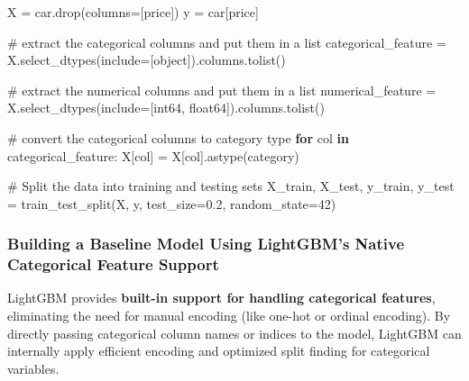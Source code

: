 \documentclass[
  letterpaper,
  DIV=11,
  numbers=noendperiod]{scrreprt}
\newenvironment{Shaded}{\begin{snugshade}}{\end{snugshade}}
\newcommand{\CommentTok}[1]{\textcolor[rgb]{0.37,0.37,0.37}{#1}}
\newcommand{\ControlFlowTok}[1]{\textcolor[rgb]{0.00,0.23,0.31}{\textbf{#1}}}
\newcommand{\DecValTok}[1]{\textcolor[rgb]{0.68,0.00,0.00}{#1}}
\newcommand{\FloatTok}[1]{\textcolor[rgb]{0.68,0.00,0.00}{#1}}
\newcommand{\KeywordTok}[1]{\textcolor[rgb]{0.00,0.23,0.31}{\textbf{#1}}}
\newcommand{\NormalTok}[1]{\textcolor[rgb]{0.00,0.23,0.31}{#1}}
\newcommand{\OperatorTok}[1]{\textcolor[rgb]{0.37,0.37,0.37}{#1}}
\newcommand{\StringTok}[1]{\textcolor[rgb]{0.13,0.47,0.30}{#1}}
\begin{document}
\begin{Shaded}
\begin{Highlighting}[]
\NormalTok{X }\OperatorTok{=}\NormalTok{ car.drop(columns}\OperatorTok{=}\NormalTok{[}\StringTok{\textquotesingle{}price\textquotesingle{}}\NormalTok{])}
\NormalTok{y }\OperatorTok{=}\NormalTok{ car[}\StringTok{\textquotesingle{}price\textquotesingle{}}\NormalTok{]}

\CommentTok{\# extract the categorical columns and put them in a list}
\NormalTok{categorical\_feature }\OperatorTok{=}\NormalTok{ X.select\_dtypes(include}\OperatorTok{=}\NormalTok{[}\StringTok{\textquotesingle{}object\textquotesingle{}}\NormalTok{]).columns.tolist()}

\CommentTok{\# extract the numerical columns and put them in a list}
\NormalTok{numerical\_feature }\OperatorTok{=}\NormalTok{ X.select\_dtypes(include}\OperatorTok{=}\NormalTok{[}\StringTok{\textquotesingle{}int64\textquotesingle{}}\NormalTok{, }\StringTok{\textquotesingle{}float64\textquotesingle{}}\NormalTok{]).columns.tolist()}

\CommentTok{\# convert the categorical columns to category type}
\ControlFlowTok{for}\NormalTok{ col }\KeywordTok{in}\NormalTok{ categorical\_feature:}
\NormalTok{    X[col] }\OperatorTok{=}\NormalTok{ X[col].astype(}\StringTok{\textquotesingle{}category\textquotesingle{}}\NormalTok{)}


\CommentTok{\# Split the data into training and testing sets}
\NormalTok{X\_train, X\_test, y\_train, y\_test }\OperatorTok{=}\NormalTok{ train\_test\_split(X, y, test\_size}\OperatorTok{=}\FloatTok{0.2}\NormalTok{, random\_state}\OperatorTok{=}\DecValTok{42}\NormalTok{)}
\end{Highlighting}
\end{Shaded}

\subsubsection{Building a Baseline Model Using LightGBM's Native
Categorical Feature
Support}\label{building-a-baseline-model-using-lightgbms-native-categorical-feature-support}

LightGBM provides \textbf{built-in support for handling categorical
features}, eliminating the need for manual encoding (like one-hot or
ordinal encoding). By directly passing categorical column names or
indices to the model, LightGBM can internally apply efficient encoding
and optimized split finding for categorical variables.
\end{document}
